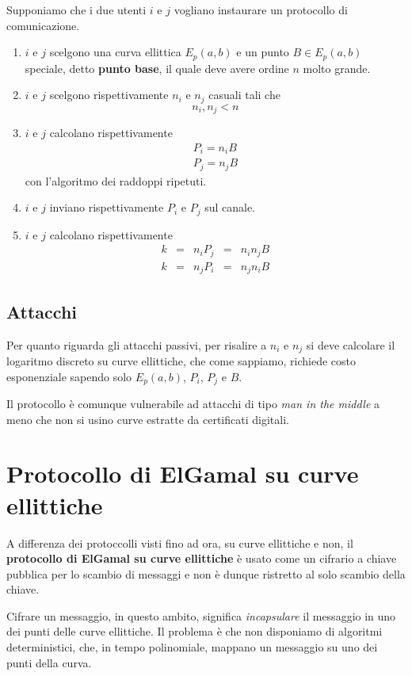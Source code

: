 Supponiamo che i due utenti $i$ e $j$ vogliano instaurare un protocollo di comunicazione.
\begin{enumerate}
	\item $i$ e $j$ scelgono una curva ellittica $E_p(a, b)$ e un punto $B \in E_p(a, b)$ speciale, detto
	      \textbf{punto base}, il quale deve avere ordine $n$ molto grande.
	\item $i$ e $j$ scelgono rispettivamente $n_i$ e $n_j$ casuali tali che
	      \[ n_i, n_j < n \]
	\item $i$ e $j$ calcolano rispettivamente
	      \[
		      \begin{matrix}
			      P_i = n_i B \\
			      P_j = n_j B
		      \end{matrix}
	      \]
	      con l'algoritmo dei raddoppi ripetuti.
	\item $i$ e $j$ inviano rispettivamente $P_i$ e $P_j$ sul canale.
	\item $i$ e $j$ calcolano rispettivamente
	      \[
		      \begin{matrix}
			      k & = & n_i P_j & = & n_i n_j B \\
			      k & = & n_j P_i & = & n_j n_i B
		      \end{matrix}
	      \]
\end{enumerate}

\subsection{Attacchi}
Per quanto riguarda gli attacchi passivi, per risalire a $n_i$ e $n_j$ si deve calcolare il logaritmo discreto
su curve ellittiche, che come sappiamo, richiede costo esponenziale sapendo solo $E_p(a, b)$, $P_i$, $P_j$ e $B$.

Il protocollo \`e comunque vulnerabile ad attacchi di tipo \emph{man in the middle} a meno che non si usino curve
estratte da certificati digitali.

\section{Protocollo di ElGamal su curve ellittiche}
A differenza dei protoccolli visti fino ad ora, su curve ellittiche e non, il \textbf{protocollo di ElGamal su curve
	ellittiche} \`e usato come un cifrario a chiave pubblica per lo scambio di messaggi e non \`e dunque ristretto
al solo scambio della chiave.

Cifrare un messaggio, in questo ambito, significa \emph{incapsulare} il messaggio in uno dei punti delle curve
ellittiche. Il problema \`e che non disponiamo di algoritmi deterministici, che, in tempo polinomiale, mappano
un messaggio su uno dei punti della curva.

